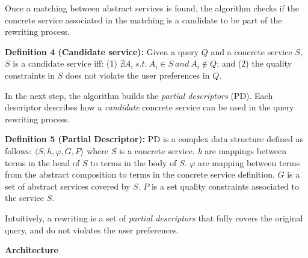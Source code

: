 \documentclass[12pt,a4paper,oneside]{article}
\begin{document}

Once a matching between abstract services is found, the algorithm checks if the concrete service associated in the matching is a candidate to be part of the rewriting process.

\noindent \textbf{Definition 4 (Candidate service):} Given a query $Q$ and a concrete service $S$, $S$ is a candidate service iff: (1) $\nexists A_{i} \ s.t. \ A_{i} \in S \ and \ A_{i} \not\in Q$; and (2) the quality constraints in $S$ does not violate the user preferences in $Q$. 


In the next step, the algorithm builds the \textit{partial descriptors} (PD). 
Each descriptor describes how a \textit{candidate} concrete service can be used in the query rewriting process.

\noindent \textbf{Definition 5 (Partial Descriptor):} PD is a complex data structure defined as follows: 
$\langle S, h, \varphi, G, P\rangle$
where $S$ is a concrete service. 
\textit{h} are mappings between terms in the head of $S$ to terms in the body of $S$. 
$\varphi$ are mapping between terms from the abstract composition to terms in the concrete service definition.
$G$ is a set of abstract services covered by $S$. 
$P$ is a set quality constraints associated to the service $S$. 

Intuitively, a rewriting is a set of \textit{partial descriptors} that fully covers the original query, and do not violates the user preferences.

\begin{flushleft}
\textbf{Architecture}
\end{flushleft}
\end{document}
